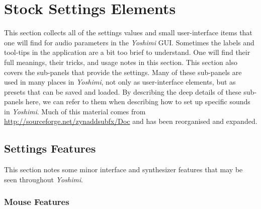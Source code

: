%
%
%

\section{Stock Settings Elements}
\label{sec:stock_settings_elements}

   This section collects all of the settings values and small user-interface
   items that one will find for audio parameters in the \textsl{Yoshimi} GUI.
   Sometimes the labels and tool-tips in the application are a bit too brief to
   understand.  One will find their full meanings, their tricks, and usage
   notes in this section.
   This section also covers the sub-panels that provide the settings.
   Many of these sub-panels are used in many places in \textsl{Yoshimi},
   not only as user-interface elements, but as presets that can be saved and
   loaded.
   By describing the deep details of these sub-panels
   here, we can refer to them when
   describing how to set up specific sounds in
   \textsl{Yoshimi}.
   Much of this material comes from
   \url{http://sourceforge.net/zynaddsubfx/Doc}
   and has been reorganised and expanded.

\subsection{Settings Features}
\label{subsec:stock_settings_ui_features}

   This section notes some minor interface and synthesizer features that may
   be seen throughout \textsl{Yoshimi}.

\subsubsection{Mouse Features}
\label{subsubsec:stock_settings_mouse_features}


